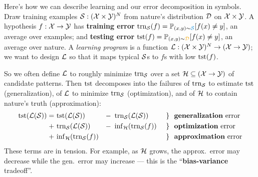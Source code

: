 


\marginnote{\veryoptional}
  Here's how we can describe learning and our error decomposition in
  symbols.
  Draw training examples $\mathcal{S} : (\mathcal{X}\times \mathcal{Y})^N$
  from nature's distribution $\mathcal{D}$ on $\mathcal{X}\times \mathcal{Y}$.  A hypothesis
  $f:\mathcal{X}\to \mathcal{Y}$ has \textbf{training error}
  $
     \Ein(f) = \Pp_{(x,y)\sim \blu{\sS}}[f(x)\neq y]
  $, an average over examples; and \textbf{testing error}
  $
     \Eout(f) = \Pp_{(x,y)\sim \rng{\dD}}[f(x)\neq y]
  $, an average over nature.  A \emph{learning program} is a function
  $
      \mathcal{L} : (\mathcal{X}\times \mathcal{Y})^N \to (\mathcal{X}\to \mathcal{Y})
  $; we want to design $\mathcal{L}$ so that it maps typical $\mathcal{S}$s to $f$s with
  low $\text{tst}(f)$.

  So
  we often define
  $\mathcal{L}$ to roughly
  minimize $\text{trn}_{\mathcal{S}}$ over a
  set $\mathcal{H} \subseteq (\mathcal{X}\to \mathcal{Y})$ of candidate patterns.  Then $\text{tst}$
  decomposes
  into the failures
  of
  $\text{trn}_{\mathcal{S}}$ to estimate $\text{tst}$ (generalization),
  of
  $\mathcal{L}$ to minimize $\text{trn}_{\mathcal{S}}$ (optimization), and
  of
  $\mathcal{H}$ to contain
  nature's
  truth (approximation):
  \newcommand{\minf}[1]{{\inf}_{\hH}}
  \begin{align*}
      \Eout(\lL(\sS))
      =~&\Eout(\lL(\sS))      &-\,\,\,&      \Ein(\lL(\sS)) &~\}~~& \text{\textbf{generalization} error} \\
      +~&\Ein(\lL(\sS))       &-\,\,\,& \minf{\hH}(\Ein(f)) &~\}~~& \text{\textbf{optimization} error} \\
      +~&\minf{\hH}(\Ein(f))  &       &                     &~\}~~& \text{\textbf{approximation} error}
  \end{align*}
  These terms are in tension.  For example, as $\mathcal{H}$ grows, the
  approx.\ error may decrease while the gen.\ error may
  increase --- this is the ``\textbf{bias-variance} tradeoff''.

